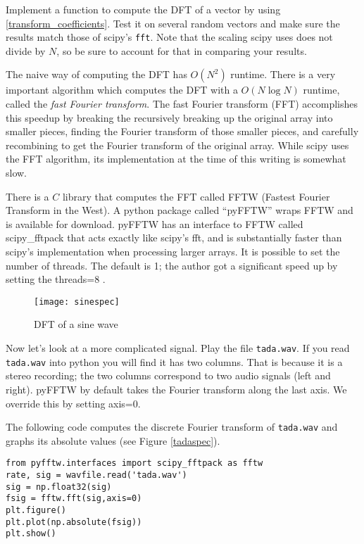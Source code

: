 \begin{problem}
Implement a function to compute the DFT of a vector by using \eqref{transform_coefficients}. %
Test it on several random vectors and make sure the results match those of scipy's \texttt{fft}.  
Note that the scaling scipy uses does not divide by $N$, so be sure to account for that in comparing your results.
\end{problem}

The naive way of computing the DFT has $O(N^2)$ runtime.   
There is a very important algorithm which computes the DFT with a $O(N \log N)$ runtime, called the \emph{fast Fourier transform}. 
The fast Fourier transform (FFT) accomplishes this speedup by breaking the recursively breaking up the original array into smaller pieces, finding the Fourier transform of those smaller pieces, and carefully recombining to get the Fourier transform of the original array.  
While scipy uses the FFT algorithm, its implementation at the time of this writing is somewhat slow.

There is a $C$ library that computes the FFT called FFTW (Fastest Fourier Transform in the West).  
A python package called ``pyFFTW'' wraps FFTW and is available for download. 
pyFFTW  has an interface to FFTW called scipy\_fftpack that acts exactly like scipy's fft, and is substantially faster than scipy's implementation when processing larger arrays. 
It is possible to set the number of threads. The default is 1; the author got a significant speed up by setting the threads=8 .

\begin{figure}[ht]\caption{DFT of a sine wave}\label{sinespec}\centering\texttt{[image: sinespec]}\end{figure}

Now let's look at a more complicated signal. Play the file \texttt{tada.wav}.  
If you read \texttt{tada.wav} into python you will find it has two columns.  
That is because it is a stereo recording; the two columns correspond to two audio signals (left and right).  
pyFFTW by default takes the Fourier transform along the last axis.  We override this by setting axis=0. 

The following code computes the discrete Fourier transform of \texttt{tada.wav} and graphs its absolute values (see Figure \ref{tadaspec}).
\begin{lstlisting}
from pyfftw.interfaces import scipy_fftpack as fftw
rate, sig = wavfile.read('tada.wav')
sig = np.float32(sig)
fsig = fftw.fft(sig,axis=0)
plt.figure()
plt.plot(np.absolute(fsig))
plt.show()
\end{lstlisting}


